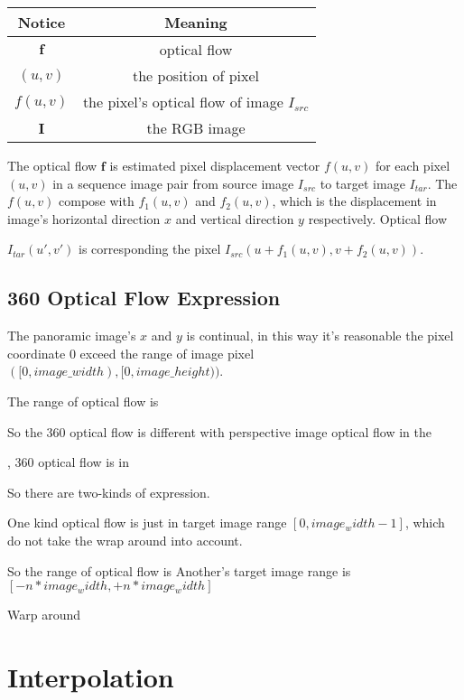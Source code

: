 \begin{center}
	\begin{tabular}{||c c ||} 
		\hline
		Notice & Meaning  \\ [0.5ex] 
		\hline\hline
		$\textbf{f}$ & optical flow  \\ 
		\hline
		$(u,v)$ & the position of pixel   \\
		\hline
		$f(u,v)$ & the pixel's optical flow of image $I_{src}$ \\
		\hline
		$\textbf{I}$ & the RGB image  \\ [1ex] 
		\hline
	\end{tabular}
\end{center}

The optical flow $\textbf{f}$ is estimated pixel displacement vector $f(u,v)$ for each pixel $(u,v)$ in a sequence image pair from source image $I_{src}$ to target image $I_{tar}$.
The $f(u,v)$ compose with $f_1(u,v)$ and $f_2(u,v)$, which is the displacement in image's horizontal direction $x$ and vertical direction $y$ respectively.
Optical flow 

$I_{tar}(u',v')$ is corresponding the pixel $I_{src}(u + f_1(u,v), v + f_2(u,v))$.


\subsection{360 Optical Flow Expression}

The panoramic image's $x$ and $y$ is continual, in this way it's reasonable the pixel coordinate 0 exceed the range of image pixel $([0, image\_width), [0, image\_height))$. 

The range of optical flow is 

So the 360 optical flow is different with perspective image optical flow in the 

, 360 optical flow is  in 

So there are two-kinds of expression.

One kind optical flow is just in target image range $[0, image_width - 1]$, which do not take the wrap around into account.

So the range of optical flow is 
Another's target image range is $[- n * image_width, + n * image_width]$

Warp around


\section{Interpolation}


